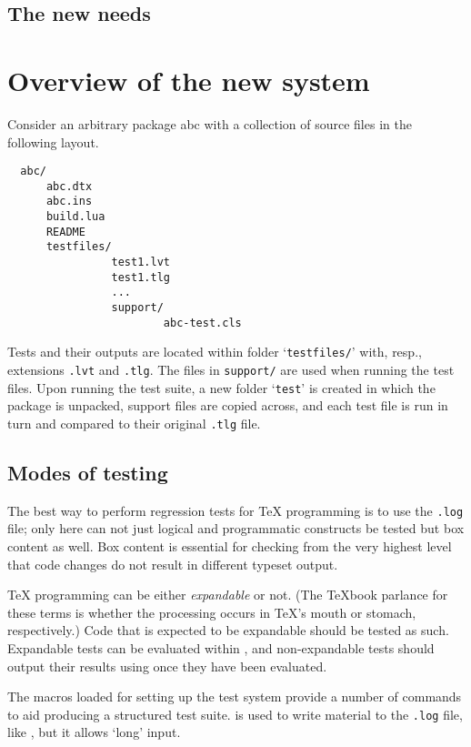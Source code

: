\documentclass[a4paper]{ltugboat}
\begin{document}
\subsection{The new needs}



\section{Overview of the new system}
\label{sec:overview}

Consider an arbitrary package \textsf{abc} with a collection of source files in the following layout.
\begin{Verbatim}
  abc/
      abc.dtx
      abc.ins
      build.lua
      README
      testfiles/
                test1.lvt
                test1.tlg
                ...
                support/
                        abc-test.cls
\end{Verbatim}
Tests and their outputs are located within folder `\texttt{testfiles/}' with, resp., extensions \texttt{.lvt} and \texttt{.tlg}.
The files in \texttt{support/} are used when running the test files.
Upon running the test suite, a new folder `\texttt{test}' is created in which the package is unpacked, support files are copied across, and each test file is run in turn and compared to their original \texttt{.tlg} file.

\subsection{Modes of testing}

The best way to perform regression tests for \TeX{} programming is to use the \texttt{.log} file; only here can not just logical and programmatic constructs be tested but box content as well.
Box content is essential for checking from the very highest level that code changes do not result in different typeset output.

\TeX{} programming can be either \emph{expandable} or not.
(The \TeX book parlance for these terms is whether the processing occurs in \TeX's mouth or stomach, respectively.)
Code that is expected to be expandable should be tested as such.
Expandable tests can be evaluated within , and non-expandable tests should output their results using  once they have been evaluated.

The macros loaded for setting up the test system provide a number of commands to aid producing a structured test suite.  is used to write material to the \texttt{.log} file, like , but it allows `long' input.
\end{document}
